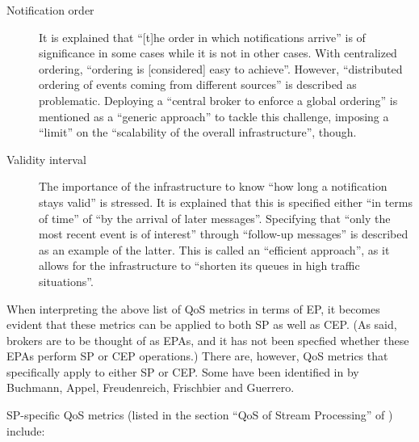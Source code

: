 \documentclass[article, type=bsc, colorback, accentcolor=tud8b, parskip=half, bibliography=totocnumbered]{tudthesis}
\begin{document}
\begin{description}
\item[Notification order]
It is explained that ``[t]he order in which notifications arrive'' is of significance in some cases while it is not in other cases.
With centralized ordering, ``ordering is [considered] easy to achieve''.
However, ``distributed ordering of events coming from different sources'' is described as problematic.
Deploying a ``central broker to enforce a global ordering'' is mentioned as a ``generic approach'' to tackle this challenge, imposing a ``limit'' on the ``scalability of the overall infrastructure'', though.

\item[Validity interval]
The importance of the infrastructure to know ``how long a notification stays valid'' is stressed.
It is explained that this is specified either ``in terms of time'' of ``by the arrival of later messages''.
Specifying that ``only the most recent event is of interest'' through ``follow-up messages'' is described as an example of the latter.
This is called an ``efficient approach'', as it allows for the infrastructure to ``shorten its queues in high traffic situations''.

\end{description}

When interpreting the above list of QoS metrics in terms of EP, it becomes evident that these metrics can be applied to both SP as well as CEP.
(As said, brokers are to be thought of as EPAs, and it has not been specfied whether these EPAs perform SP or CEP operations.)
There are, however, QoS metrics that specifically apply to either SP or CEP.
Some have been identified in \cite{Buchmann:2012:CEA:2413516.2413519} by Buchmann, Appel, Freudenreich, Frischbier and Guerrero.

SP-specific QoS metrics (listed in the section ``QoS of Stream Processing'' of \cite{Buchmann:2012:CEA:2413516.2413519}) include:
\end{document}

